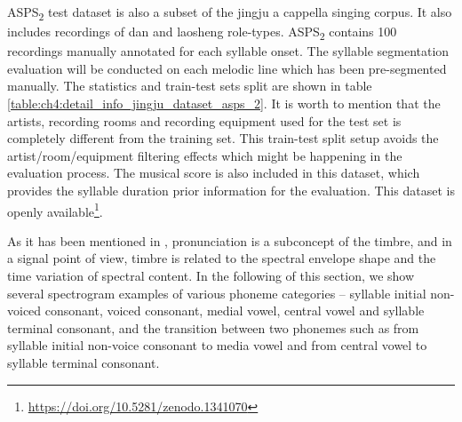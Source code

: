 ASPS\textsubscript{2} test dataset is also a subset of the jingju a cappella singing corpus. It also includes recordings of dan and laosheng role-types. ASPS\textsubscript{2} contains 100 recordings manually annotated for each syllable onset. The syllable segmentation evaluation will be conducted on each melodic line which has been pre-segmented manually. The statistics and train-test sets split are shown in table \ref{table:ch4:detail_info_jingju_dataset_asps_2}. It is worth to mention that the artists, recording rooms and recording equipment used for the test set is completely different from the training set. This train-test split setup avoids the artist/room/equipment filtering effects which might be happening in the evaluation process\cite{Flexer2010}. The musical score is also included in this dataset, which provides the syllable duration prior information for the evaluation. This dataset is openly available\footnote{\url{https://doi.org/10.5281/zenodo.1341070}\label{fn:jingju_dataset}}.

As it has been mentioned in , pronunciation is a subconcept of the timbre, and in a signal point of view, timbre is related to the spectral envelope shape and the time variation of spectral content. In the following of this section, we show several spectrogram examples of various phoneme categories -- syllable initial non-voiced consonant, voiced consonant, medial vowel, central vowel and syllable terminal consonant, and the transition between two phonemes such as from syllable initial non-voice consonant to media vowel and from central vowel to syllable terminal consonant.

